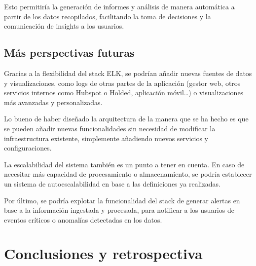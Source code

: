 Esto permitiría la generación de informes y análisis de manera automática a
partir de los datos recopilados, facilitando la toma de decisiones y la
comunicación de insights a los usuarios.

\subsection{Más perspectivas futuras}
Gracias a la flexibilidad del stack ELK, se podrían añadir nuevas fuentes de
datos y visualizaciones, como logs de otras partes de la aplicación (gestor web,
otros servicios internos como Hubspot o Holded, aplicación móvil\ldots) o
visualizaciones más avanzadas y personalizadas.

Lo bueno de haber diseñado la arquitectura de la manera que se ha hecho
es que se pueden añadir nuevas funcionalidades sin necesidad de modificar
la infraestructura existente, simplemente añadiendo nuevos servicios y
configuraciones.

La escalabilidad del sistema también es un punto a tener en cuenta. En caso de
necesitar más capacidad de procesamiento o almacenamiento, se podría establecer
un sistema de autoescalabilidad en base a las definiciones ya realizadas.

Por último, se podría explotar la funcionalidad del stack de generar alertas
en base a la información ingestada y procesada, para notificar a los usuarios
de eventos críticos o anomalías detectadas en los datos.


\newpage{}
\section{Conclusiones y retrospectiva}
